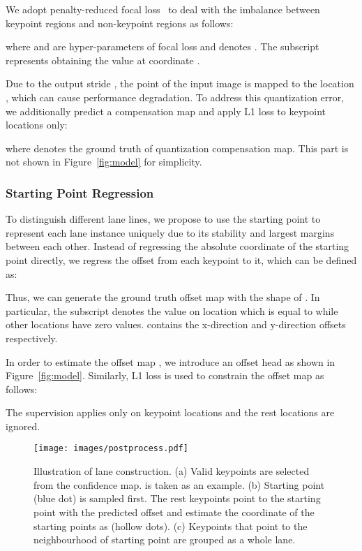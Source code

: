 \documentclass[10pt,twocolumn,letterpaper]{article}
\begin{document}
We adopt penalty-reduced focal loss~\cite{lin2017focal} to deal with the imbalance between keypoint regions and non-keypoint regions as follows:

\begin{scriptsize}

\end{scriptsize}
where  and  are hyper-parameters of focal loss and  denotes . The subscript  represents obtaining the value at coordinate . 

Due to the output stride , the point  of the input image is mapped to the location , which can cause performance degradation. 
To address this quantization error, we additionally predict a compensation map  and apply L1 loss to keypoint locations only:

where  denotes the ground truth of quantization compensation map.
This part is not shown in Figure~\ref{fig:model} for simplicity.

\subsubsection{Starting Point Regression}
\label{sec:regress}
To distinguish different lane lines, we propose to use the starting point to represent each lane instance uniquely due to its stability and largest margins between each other.
Instead of regressing the absolute coordinate  of the starting point directly, we regress the offset from each keypoint to it, which can be defined as:


Thus, we can generate the ground truth offset map  with the shape of . In particular, the subscript  denotes the value on location  which is equal to  while other locations have zero values.  contains the x-direction and y-direction offsets respectively. 

In order to estimate the offset map , we introduce an offset head as shown in Figure~\ref{fig:model}. Similarly, L1 loss is used to constrain the offset map as follows:

The supervision applies only on keypoint locations and the rest locations are ignored.

\begin{figure}[!t]
    \centering
    \texttt{[image: images/postprocess.pdf]}
    \caption{Illustration of lane construction. (a) Valid keypoints are selected from the confidence map.  is taken as an example. (b) Starting point  (blue dot) is sampled first. The rest keypoints point to the starting point with the predicted offset  and estimate the coordinate of the starting points as  (hollow dots). (c) Keypoints that point to the neighbourhood of starting point  are grouped as a whole lane.}
    \label{fig:postprocess}
\end{figure}
\end{document}

